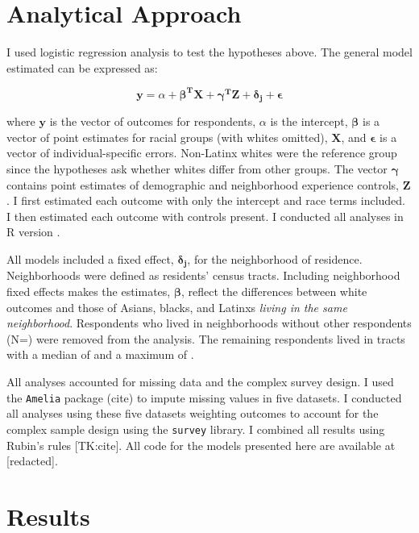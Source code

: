 \documentclass{baderart}
\begin{document}
\section{Analytical Approach}\label{analytical-approach}

I used logistic regression analysis to test the hypotheses above. The
general model estimated can be expressed as:

\[\mathbf{y} = \alpha + \mathbf{\beta^T X} + \mathbf{\gamma^T Z} + \mathbf{\delta_j} + \mathbf{\epsilon}\]

\noindent where \(\mathbf{y}\) is the vector of outcomes for
respondents, \(\alpha\) is the intercept, \(\mathbf{\beta}\) is a vector
of point estimates for racial groups (with whites omitted),
\(\mathbf{X}\), and \(\mathbf{\epsilon}\) is a vector of
individual-specific errors. Non-Latinx whites were the reference group
since the hypotheses ask whether whites differ from other groups. The
vector \(\mathbf{\gamma}\) contains point estimates of demographic and
neighborhood experience controls, \(\mathbf{Z}\). I first estimated each
outcome with only the intercept and race terms included. I then
estimated each outcome with controls present. I conducted all analyses
in R version \Rversion.

All models included a fixed effect, \(\mathbf{\delta_j}\), for the
neighborhood of residence. Neighborhoods were defined as residents'
census tracts. Including neighborhood fixed effects makes the estimates,
\(\mathbf{\beta}\), reflect the differences between white outcomes and
those of Asians, blacks, and Latinxs \emph{living in the same
neighborhood}. Respondents who lived in neighborhoods without other
respondents (N=\oneresp) were removed from the analysis. The remaining
respondents lived in tracts with a median of \medNpertract and a maximum
of \maxNpertract.

All analyses accounted for missing data and the complex survey design. I
used the \texttt{Amelia} package (cite) to impute missing values in five
datasets. I conducted all analyses using these five datasets weighting
outcomes to account for the complex sample design using the
\texttt{survey} library. I combined all results using Rubin's rules
{[}TK:cite{]}. All code for the models presented here are available at
{[}redacted{]}.

\section{Results}\label{results}
\end{document}
